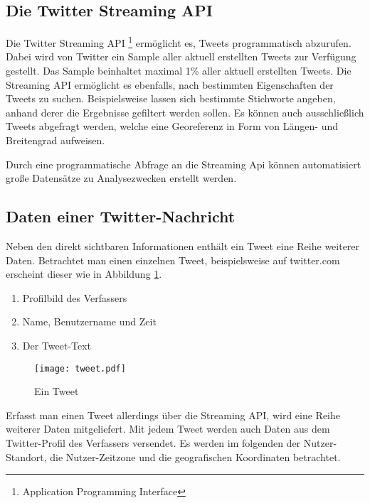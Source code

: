 		\subsection{Die Twitter Streaming API}

			Die Twitter Streaming API \footnote{Application Programming Interface} ermöglicht es, Tweets programmatisch abzurufen.
			Dabei wird von Twitter ein Sample aller aktuell erstellten Tweets zur Verfügung gestellt.  
			Das Sample beinhaltet maximal 1\% aller aktuell erstellten Tweets.
			Die Streaming API ermöglicht es ebenfalls, nach bestimmten Eigenschaften der Tweets zu suchen.
			Beispielsweise lassen sich bestimmte Stichworte angeben, anhand derer die Ergebnisse gefiltert werden sollen.
			Es können auch ausschließlich Tweets abgefragt werden, welche eine Georeferenz in Form von Längen- und Breitengrad aufweisen. 

			Durch eine programmatische Abfrage an die Streaming Api können automatisiert große Datensätze zu Analysezwecken erstellt werden. 

		\subsection{Daten einer Twitter-Nachricht} \label{sub:DatenInTwitterNachricht} 
			
			Neben den direkt sichtbaren Informationen enthält ein Tweet eine Reihe weiterer Daten.
			Betrachtet man einen einzelnen Tweet, beispielsweise auf twitter.com erscheint dieser wie in Abbildung \ref{img:tweet}.

			\begin{enumerate}
				\item Profilbild des Verfassers
				\item Name, Benutzername und Zeit
				\item Der Tweet-Text
			\end{enumerate}


			\begin{figure}[h!]
			\begin{center}
			\texttt{[image: tweet.pdf]}
			\caption{Ein Tweet}
			\label{img:tweet}
			\end{center}
			\end{figure}	


			Erfasst man einen Tweet allerdings über die Streaming API, wird eine Reihe weiterer Daten mitgeliefert.
			Mit jedem Tweet werden auch Daten aus dem Twitter-Profil des Verfassers versendet.
			Es werden im folgenden der Nutzer-Standort, die Nutzer-Zeitzone und die geografischen Koordinaten betrachtet.

